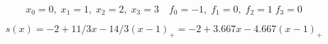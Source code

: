 \[ x_0=0, \; x_1=1, \; x_2=2, \; x_3=3 \quad f_0=-1, \; f_1=0, \; f_2=1 \; f_3=0 \]

\[ s(x)=-2+11/3x-14/3(x-1)_+= -2+3.667x-4.667(x-1)_+ \]

